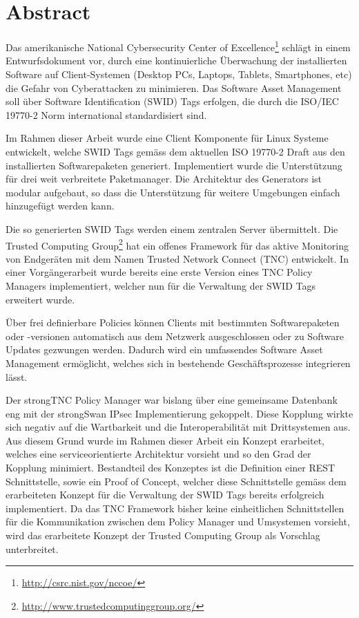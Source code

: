 \chapter{Abstract}

Das amerikanische National Cybersecurity Center of
Excellence\footnote{\url{http://csrc.nist.gov/nccoe/}} schlägt in einem
Entwurfsdokument vor, durch eine kontinuierliche Überwachung der installierten
Software auf Client-Systemen (Desktop PCs, Laptops, Tablets, Smartphones, etc)
die Gefahr von Cyberattacken zu minimieren. Das Software Asset Management soll
über Software Identification (SWID) Tags erfolgen, die durch die ISO/IEC
19770-2\cite{iso19770-2} Norm international standardisiert sind.

Im Rahmen dieser Arbeit wurde eine Client Komponente für Linux Systeme
entwickelt, welche SWID Tags gemäss dem aktuellen ISO 19770-2 Draft aus den
installierten Softwarepaketen generiert. Implementiert wurde die Unterstützung
für drei weit verbreitete Paketmanager. Die Architektur des Generators ist
modular aufgebaut, so dass die Unterstützung für weitere Umgebungen einfach
hinzugefügt werden kann.

Die so generierten SWID Tags werden einem zentralen Server übermittelt. Die
Trusted Computing Group\footnote{\url{http://www.trustedcomputinggroup.org/}}
hat ein offenes Framework für das aktive Monitoring von Endgeräten mit dem Namen
Trusted Network Connect (TNC) entwickelt. In einer Vorgängerarbeit wurde bereits
eine erste Version eines TNC Policy Managers implementiert, welcher nun für die
Verwaltung der SWID Tags erweitert wurde.

Über frei definierbare Policies können Clients mit bestimmten Softwarepaketen
oder -versionen automatisch aus dem Netzwerk ausgeschlossen oder zu Software
Updates gezwungen werden. Dadurch wird ein umfassendes Software Asset Management
ermöglicht, welches sich in bestehende Geschäftsprozesse integrieren lässt.

Der strongTNC Policy Manager war bislang über eine gemeinsame Datenbank eng mit
der strongSwan IPsec Implementierung gekoppelt. Diese Kopplung wirkte sich
negativ auf die Wartbarkeit und die Interoperabilität mit Drittsystemen aus. Aus
diesem Grund wurde im Rahmen dieser Arbeit ein Konzept erarbeitet, welches eine
serviceorientierte Architektur vorsieht und so den Grad der Kopplung minimiert.
Bestandteil des Konzeptes ist die Definition einer REST Schnittstelle, sowie ein
Proof of Concept, welcher diese Schnittstelle gemäss dem erarbeiteten Konzept
für die Verwaltung der SWID Tags bereits erfolgreich implementiert. Da das TNC
Framework bisher keine einheitlichen Schnittstellen für die Kommunikation
zwischen dem Policy Manager und Umsystemen vorsieht, wird das erarbeitete
Konzept der Trusted Computing Group als Vorschlag unterbreitet.
